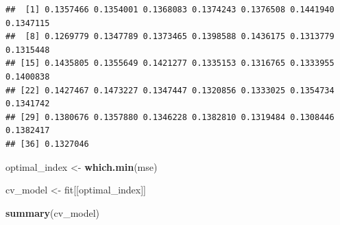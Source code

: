 \documentclass[]{article}
\newenvironment{Shaded}{\begin{snugshade}}{\end{snugshade}}
\newcommand{\DataTypeTok}[1]{\textcolor[rgb]{0.13,0.29,0.53}{#1}}
\newcommand{\DecValTok}[1]{\textcolor[rgb]{0.00,0.00,0.81}{#1}}
\newcommand{\KeywordTok}[1]{\textcolor[rgb]{0.13,0.29,0.53}{\textbf{#1}}}
\newcommand{\NormalTok}[1]{#1}
\newcommand{\OperatorTok}[1]{\textcolor[rgb]{0.81,0.36,0.00}{\textbf{#1}}}
\newcommand{\OtherTok}[1]{\textcolor[rgb]{0.56,0.35,0.01}{#1}}
\newcommand{\StringTok}[1]{\textcolor[rgb]{0.31,0.60,0.02}{#1}}
\begin{document}
\begin{Shaded}
\end{Shaded}

\begin{verbatim}
##  [1] 0.1357466 0.1354001 0.1368083 0.1374243 0.1376508 0.1441940 0.1347115
##  [8] 0.1269779 0.1347789 0.1373465 0.1398588 0.1436175 0.1313779 0.1315448
## [15] 0.1435805 0.1355649 0.1421277 0.1335153 0.1316765 0.1333955 0.1400838
## [22] 0.1427467 0.1473227 0.1347447 0.1320856 0.1333025 0.1354734 0.1341742
## [29] 0.1380676 0.1357880 0.1346228 0.1382810 0.1319484 0.1308446 0.1382417
## [36] 0.1327046
\end{verbatim}

\begin{Shaded}
\begin{Highlighting}[]
\NormalTok{optimal_index <-}\StringTok{ }\KeywordTok{which.min}\NormalTok{(mse)}

\NormalTok{cv_model <-}\StringTok{ }\NormalTok{fit[[optimal_index]]}

\KeywordTok{summary}\NormalTok{(cv_model)}
\end{Highlighting}
\end{Shaded}
\end{document}
